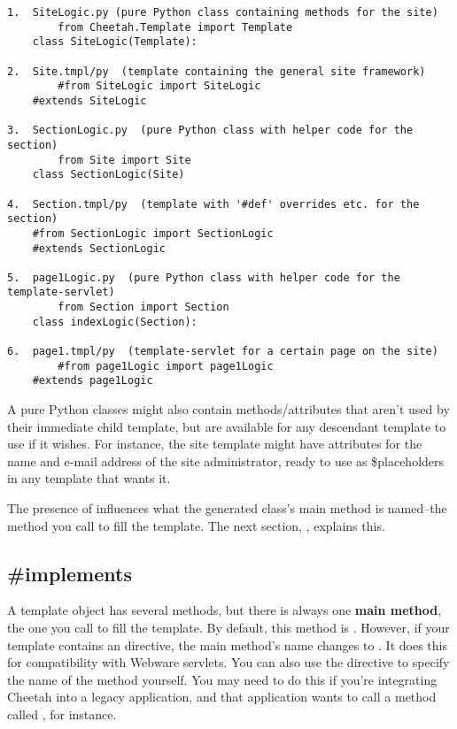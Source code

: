 \begin{verbatim}
1.  SiteLogic.py (pure Python class containing methods for the site)
        from Cheetah.Template import Template
	class SiteLogic(Template):

2.  Site.tmpl/py  (template containing the general site framework)
        #from SiteLogic import SiteLogic
	#extends SiteLogic

3.  SectionLogic.py  (pure Python class with helper code for the section)
        from Site import Site
	class SectionLogic(Site)

4.  Section.tmpl/py  (template with '#def' overrides etc. for the section)
	#from SectionLogic import SectionLogic
	#extends SectionLogic

5.  page1Logic.py  (pure Python class with helper code for the template-servlet)
        from Section import Section
	class indexLogic(Section):

6.  page1.tmpl/py  (template-servlet for a certain page on the site)
        #from page1Logic import page1Logic
	#extends page1Logic
\end{verbatim}

A pure Python classes might also contain methods/attributes that aren't used by
their immediate child template, but are available for any descendant
template to use if it wishes.  For instance, the site template might have
attributes for the name and e-mail address of the site administrator, 
ready to use as \$placeholders in any template that wants it.

The presence of  influences what the generated class's main
method is named--the method you call to fill the template.  The next section,
, explains this.


\subsection{\#implements}
\label{inheritanceEtc.implements}

A template object has several methods, but there is always one {\bf main
method}, the one you call to fill the template.  By default, this method is
.  However, if your template contains an 
directive, the main method's name changes to .  It does
this for compatibility with Webware servlets.  You can also use the
 directive to specify the name of the method yourself.
You may need to do this if you're integrating Cheetah into a legacy
application, and that application wants to call a method called
, for instance.


